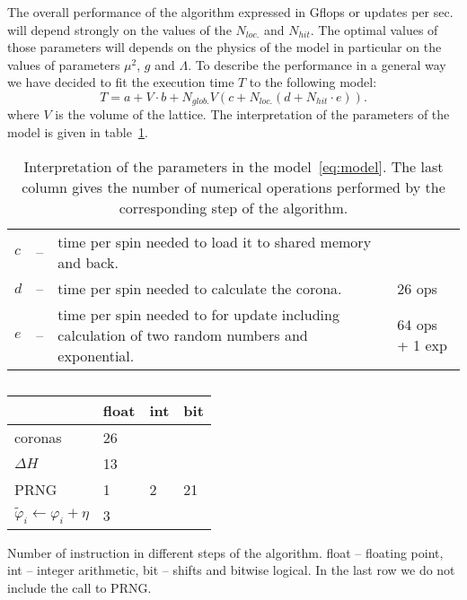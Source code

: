 \documentclass[a4paper]{llncs}
\newcommand{\vphi}{\varphi}
\begin{document}
The overall performance of the algorithm expressed in Gflops or
updates per sec. will depend strongly on the values of the $N_{loc.}$
and $N_{hit}$. The optimal values of those parameters will depends on
the physics of the model in particular on the values of parameters
$\mu^2$, $g$ and $\Lambda$. To describe the performance in a general
way we have decided to fit the execution time $T$ to the following
model:
\begin{equation}\label{eq:model}
T  = a+ V \cdot b +
N_{glob.} V \left(c + N_{loc.}\left(d + N_{hit}\cdot e\right)\right) . 
\end{equation}
where $V$ is the volume of the lattice.  The interpretation of the
parameters of the model is given in table~\ref{tab:pars-int}.

\begin{table}
\begin{center} \begin{tabular}{lcp{8cm}p{2cm}}
$c$ &--& time per spin needed to load it to shared memory and back.&\\
$d$ &--& time per spin needed to calculate the corona.& 26 ops\\
$e$ &--& time per spin needed to for update including calculation of two
random numbers and exponential. & 64 ops + 1 exp
\end{tabular}
\end{center}
\caption{\label{tab:pars-int}Interpretation of the parameters in the
model~\ref{eq:model}. The last column gives the number of numerical operations
performed by the corresponding step of the algorithm.}
\end{table}

\begin{table}
\begin{center} 
\begin{tabular}{|p{4cm}|l|l|l|}\hline\hline
 & float & int  & bit \\\hline
coronas & 26 & & \\\hline
$\Delta H  $ & 13  & & \\\hline
PRNG & 1 & 2  & 21  \\\hline
$\widetilde{\vphi}_i \gets \vphi_i+\eta$& 3 & &\\\hline\hline
\end{tabular}
\end{center}
\caption{\label{tab:instr-count}}Number of instruction in different steps of the
algorithm. float -- floating point, int -- integer arithmetic, bit -- shifts and
bitwise logical. In the last row we do not include the call to PRNG. 
\end{table}
\end{document}
